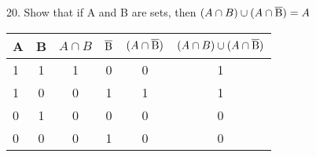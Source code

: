 \documentclass[11pt, oneside]{article}   	%
\begin{document}
20. Show that if A and B are sets, then $(A\cap B)\cup(A\cap\overline{\rm B}) = A$\\
 \begin{tabular} {| l | c | c | c | c | c |}
  \hline
  A & B & $A\cap B$ & $\overline{\rm B}$ & $(A\cap\overline{\rm B})$ & $(A\cap B)\cup(A\cap\overline{\rm B})$\\ \hline
  1 & 1 & 1 & 0 & 0 & 1\\ \hline
  1 & 0 & 0 & 1 & 1 & 1\\ \hline
  0 & 1 & 0 & 0 & 0 & 0\\ \hline
  0 & 0 & 0 & 1 & 0 & 0\\ \hline
\end{tabular}\\\\\\
\end{document}
